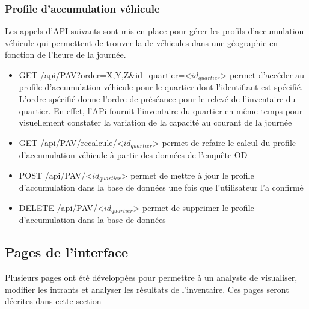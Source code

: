 \subsubsection{Profile d'accumulation véhicule}
Les appels d'\ac{API} suivants sont mis en place pour gérer les profils d'accumulation véhicule \parencite{diallo_methodology_2015} qui permettent de trouver la \fg{} de véhicules dans une géographie en fonction de l'heure de la journée.
\begin{itemize}
    \item GET /api/PAV?order=X,Y,Z\&id\_quartier=<$id_{quartier}$> permet d'accéder au profile d'accumulation véhicule pour le quartier dont l'identifiant est spécifié. L'ordre spécifié donne l'ordre de préséance pour le relevé de l'inventaire du quartier. En effet, l'APi fournit l'inventaire du quartier en même temps pour visuellement  constater la variation de la capacité au courant de la journée
    \item GET /api/PAV/recalcule/<$id_{quartier}$> permet de refaire le calcul du profile d'accumulation véhicule à partir des données de l'enquête OD
    \item POST /api/PAV/<$id_{quartier}$> permet de mettre à jour le profile d'accumulation dans la base de données une fois que l'utilisateur l'a confirmé
    \item DELETE /api/PAV/<$id_{quartier}$> permet de supprimer le profile d'accumulation dans la base de données
\end{itemize}

\clearpage
\subsection{Pages de l'interface}
Plusieurs pages ont été développées pour permettre à un analyste de visualiser, modifier les intrants et analyser les résultats de l'inventaire. Ces pages seront décrites dans cette section
